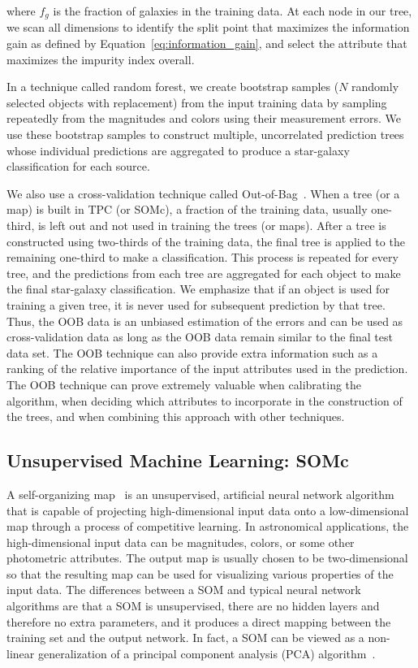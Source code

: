 \noindent
where $f_g$ is the fraction of galaxies in the training data.
At each node in our tree,
we scan all dimensions to identify the split point that
maximizes the information gain as defined by Equation~\ref{eq:information_gain},
and select the attribute that maximizes the impurity index overall.

In a technique called random forest,
we create bootstrap samples
(\ie $N$ randomly selected objects with replacement)
from the input training data
by sampling repeatedly from the magnitudes and colors
using their measurement errors.
We use these bootstrap samples to construct
multiple, uncorrelated prediction trees
whose individual predictions are aggregated to produce
a star-galaxy classification for each source.

We also use a cross-validation technique called
Out-of-Bag~\citep[OOB;][]{breiman1984classification, carrascokind2013tpz}.
When a tree (or a map) is built in TPC (or SOMc),
a fraction of the training data, usually one-third,
is left out and not used in training the trees (or maps).
After a tree is constructed using two-thirds of the training data,
the final tree is applied to the remaining one-third
to make a classification.
This process is repeated for every tree,
and the predictions from each tree are aggregated
for each object to make the final star-galaxy classification.
We emphasize that if an object is used for training a given tree,
it is never used for subsequent prediction by that tree.
Thus, the OOB data is an unbiased estimation of the errors
and can be used as cross-validation data
as long as the OOB data remain similar to the final test data set.
The OOB technique can also provide extra information such as
a ranking of the relative importance of the input attributes
used in the prediction.
The OOB technique can prove extremely valuable
when calibrating the algorithm,
when deciding which attributes to incorporate in the construction of the trees,
and when combining this approach with other techniques.


\subsection{Unsupervised Machine Learning: SOMc}

A self-organizing map~\citep{kohonen1990self, kohonen2001self}
is an unsupervised, artificial neural network algorithm
that is capable of projecting high-dimensional input data
onto a low-dimensional map
through a process of competitive learning.
In astronomical applications,
the high-dimensional input data can be
magnitudes, colors, or some other photometric attributes.
The output map is usually chosen to be two-dimensional
so that the resulting map can be used for visualizing
various properties of the input data.
The differences between a SOM and
typical neural network algorithms are
that a SOM is unsupervised,
there are no hidden layers and therefore no extra parameters,
and it produces a direct mapping
between the training set and the output network.
In fact, a SOM can be viewed as a non-linear generalization
of a principal component analysis (PCA) algorithm~\citep{yin2008self}.

